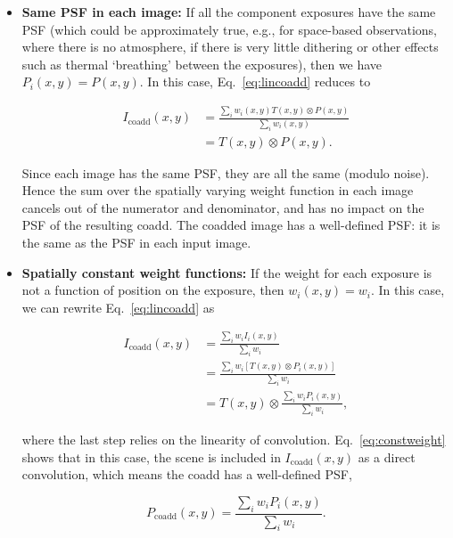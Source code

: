\documentclass{aastex63}
\begin{document}
\begin{itemize}
    \item \textbf{Same PSF in each image:} If all the component exposures have the same PSF (which could be approximately true, e.g., for space-based observations, where there is no atmosphere, if there is very little dithering or other effects such as thermal `breathing' between the exposures), then we have $P_i(x,y)=P(x,y)$.  In this case, Eq.~\eqref{eq:lincoadd} reduces to
    \begin{linenomath}\begin{align*}
         I_\text{coadd}(x,y) &= \frac{\sum_i w_i(x,y) T(x,y)\otimes P(x,y)}{\sum_i w_i(x,y)} \\
         &= T(x,y)\otimes P(x,y).
    \end{align*}\end{linenomath}
    Since each image has the same PSF, they are all the same (modulo noise).  Hence the sum over the spatially varying weight function in each image cancels out of the numerator and denominator, and has no impact on the PSF of the resulting coadd.  The coadded image has a well-defined PSF: it is the same as the PSF in each input image.
    
    \item \textbf{Spatially constant weight functions:}  If the weight for each exposure is not a function of position on the exposure, then  $w_i(x,y)=w_i$.  In this case, we can rewrite Eq.~\eqref{eq:lincoadd} as
    \begin{linenomath}\begin{align}
        I_\text{coadd}(x,y) &= \frac{\sum_i w_i I_i(x,y)}{\sum_i w_i} \nonumber\\
        &= \frac{\sum_i w_i \left[T(x,y) \otimes P_i(x,y)\right]}{\sum_i w_i} \nonumber \\
        &= T(x,y) \otimes \frac{\sum_i w_i P_i(x,y)}{\sum_i w_i},\label{eq:constweight}
    \end{align}\end{linenomath}
    where the last step relies on the linearity of convolution.  
    Eq.~\eqref{eq:constweight} shows that in this case, the scene is included in $I_\text{coadd}(x,y)$ as a direct convolution, which means the coadd has a well-defined PSF, 
    \begin{linenomath}\begin{equation}\label{eq:constweightpsf}
        P_\text{coadd}(x,y) = \frac{\sum_i w_i P_i(x,y)}{\sum_i w_i}.
    \end{equation}\end{linenomath}


\end{itemize}
\end{document}

